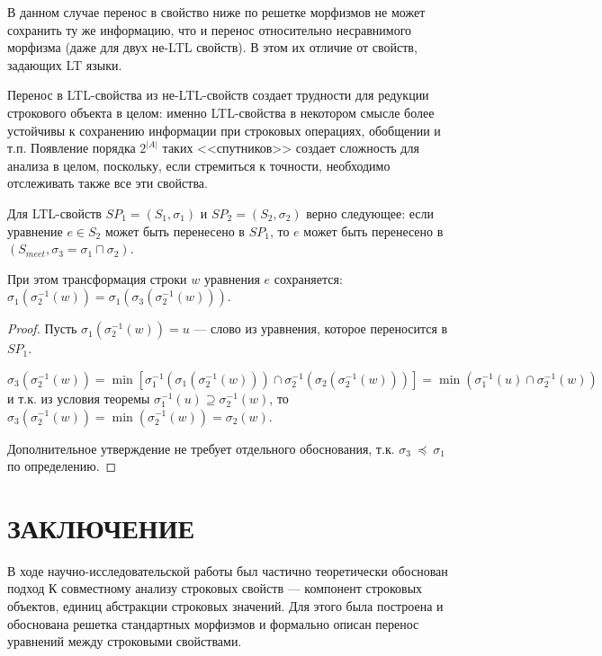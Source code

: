 \documentclass[fontsize=14pt]{scrartcl}
\providecommand{\anonsection}[1]{%
  \cleardoublepage
  \phantomsection
  \addcontentsline{toc}{section}{\protect\numberline{}#1}%
  \section*{#1}\vspace*{2.5ex}%
}
\begin{document}
В данном случае перенос в свойство ниже по решетке морфизмов не может сохранить ту же информацию, что и перенос относительно несравнимого морфизма (даже для двух не-LTL свойств).
В этом их отличие от свойств, задающих LT языки.

Перенос в LTL-свойства из не-LTL-свойств создает трудности для редукции строкового объекта в целом: именно LTL-свойства в некотором
смысле более устойчивы к сохранению информации при строковых операциях, обобщении и т.п. Появление порядка $2^{|A|}$ таких <<спутников>>
создает сложность для анализа в целом, поскольку, если стремиться к точности, необходимо отслеживать также все эти свойства.


\begin{Proposition}
Для LTL-свойств $SP_1 = (S_1, \sigma_1)$ и $SP_2 = (S_2, \sigma_2)$ верно следующее: если уравнение $e \in S_2$ может быть перенесено в $SP_1$, 
то $e$ может быть перенесено в $(S_{meet}, \sigma_3 = \sigma_1 \sqcap \sigma_2)$. 

При этом трансформация строки $w$ уравнения $e$ сохраняется: $\sigma_1(\sigma_2^{-1}(w)) = \sigma_1(\sigma_3(\sigma_2^{-1}(w)))$.
\end{Proposition}

\begin{proof}
    
    Пусть $\sigma_1(\sigma_2^{-1}(w)) = u$ --- слово из уравнения, которое переносится в $SP_1$. 

    $\sigma_3(\sigma_2^{-1}(w)) = \min [ \sigma_1^{-1}(\sigma_1(\sigma_2^{-1}(w))) \cap \sigma_2^{-1}(\sigma_2(\sigma_2^{-1}(w))) ] = 
    \min(\sigma_1^{-1}(u) \cap \sigma_2^{-1}(w))$ и т.к. из условия теоремы $\sigma_1^{-1}(u) \supseteq \sigma_2^{-1}(w)$, то
    $\sigma_3(\sigma_2^{-1}(w)) = \min(\sigma_2^{-1}(w)) = \sigma_2(w)$.

    Дополнительное утверждение не требует отдельного обоснования, т.к. $\sigma_3~\preceq~\sigma_1$ по определению.
\end{proof}


\anonsection{ЗАКЛЮЧЕНИЕ}

В ходе научно-исследовательской работы был частично теоретически обоснован подход К
совместному анализу строковых свойств --- компонент строковых объектов, единиц абстракции строковых значений.
Для этого была построена и обоснована решетка стандартных морфизмов и формально 
описан перенос уравнений между строковыми свойствами. 
\end{document}
